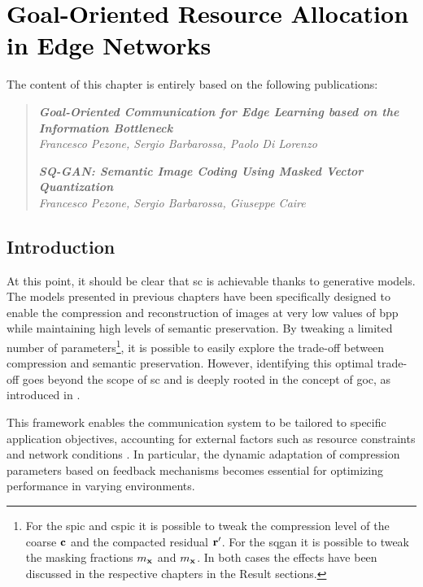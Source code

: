 \chapter{\textcolor{black}{Goal-Oriented Resource Allocation in Edge Networks}}
\label{ch: Goal_oriented}
The content of this chapter is entirely based on the following publications:
\begin{quotation}
    \noindent \textit{\textbf{\large Goal-Oriented Communication for Edge Learning based on the Information Bottleneck}}\\
    \textit{Francesco Pezone, Sergio Barbarossa, Paolo Di Lorenzo}

    \vspace{0.1cm}
    \noindent \textit{\textbf{\large SQ-GAN: Semantic Image Coding Using
Masked Vector Quantization}}\\
    \textit{Francesco Pezone, Sergio Barbarossa, Giuseppe Caire}
\end{quotation}

\section{Introduction}
At this point, it should be clear that \gls{sc} is achievable thanks to generative models. The models presented in previous chapters have been specifically designed to enable the compression and reconstruction of images at very low values of \gls{bpp} while maintaining high levels of semantic preservation. By tweaking a limited number of parameters\footnote{For the \gls{spic} and \gls{cspic} it is possible to tweak the compression level of the coarse $\mathbf{c}$ and the compacted residual $\mathbf{r}'$. For the \gls{sqgan} it is possible to tweak the masking fractions $m_{\mathbf{x}}$ and $m_{\mathbf{x}}$. In both cases the effects have been discussed in the respective chapters in the Result sections.}, it is possible to easily explore the trade-off between compression and semantic preservation. However, identifying this optimal trade-off goes beyond the scope of \gls{sc} and is deeply rooted in the concept of \gls{goc}, as introduced in .

This framework enables the communication system to be tailored to specific application objectives, accounting for external factors such as resource constraints and network conditions \cite{Strinati20216G}. In particular, the dynamic adaptation of compression parameters based on feedback mechanisms becomes essential for optimizing performance in varying environments.

